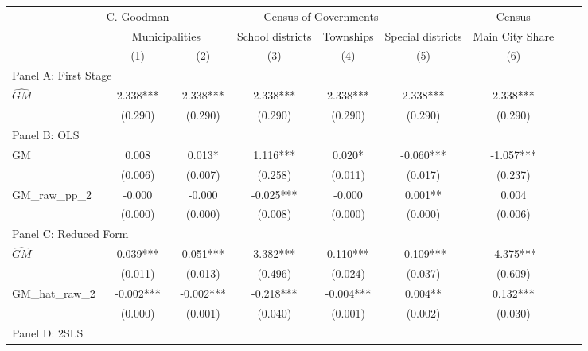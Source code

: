  \begin{tabular}{l*{8}{c}} \toprule
&\multicolumn{1}{c}{C. Goodman}&\multicolumn{4}{c}{Census of Governments}&\multicolumn{1}{c}{Census}\\\cmidrule(lr){2-2}\cmidrule(lr){3-6}\cmidrule(lr){7-7}
&\multicolumn{2}{c}{Municipalities}&\multicolumn{1}{c}{School districts}&\multicolumn{1}{c}{Townships}&\multicolumn{1}{c}{Special districts}&\multicolumn{1}{c}{Main City Share}\\\cmidrule(lr){2-3}\cmidrule(lr){4-6}\cmidrule(lr){7-7}
&\multicolumn{1}{c}{(1)}&\multicolumn{1}{c}{(2)}&\multicolumn{1}{c}{(3)}&\multicolumn{1}{c}{(4)}&\multicolumn{1}{c}{(5)}&\multicolumn{1}{c}{(6)}\\
\cmidrule(lr){1-7}
\multicolumn{6}{l}{Panel A: First Stage}\\
\cmidrule(lr){1-7}
$\widehat{GM}$  &    2.338***&    2.338***&    2.338***&    2.338***&    2.338***&    2.338***\\
                &  (0.290)   &  (0.290)   &  (0.290)   &  (0.290)   &  (0.290)   &  (0.290)   \\
\cmidrule(lr){1-7}
\multicolumn{6}{l}{Panel B: OLS}\\
\cmidrule(lr){1-7}
GM              &    0.008   &    0.013*  &    1.116***&    0.020*  &   -0.060***&   -1.057***\\
                &  (0.006)   &  (0.007)   &  (0.258)   &  (0.011)   &  (0.017)   &  (0.237)   \\
\addlinespace
GM\_raw\_pp\_2     &   -0.000   &   -0.000   &   -0.025***&   -0.000   &    0.001** &    0.004   \\
                &  (0.000)   &  (0.000)   &  (0.008)   &  (0.000)   &  (0.000)   &  (0.006)   \\
\cmidrule(lr){1-7}
\multicolumn{6}{l}{Panel C: Reduced Form}\\
\cmidrule(lr){1-7}
$\widehat{GM}$  &    0.039***&    0.051***&    3.382***&    0.110***&   -0.109***&   -4.375***\\
                &  (0.011)   &  (0.013)   &  (0.496)   &  (0.024)   &  (0.037)   &  (0.609)   \\
\addlinespace
GM\_hat\_raw\_2    &   -0.002***&   -0.002***&   -0.218***&   -0.004***&    0.004** &    0.132***\\
                &  (0.000)   &  (0.001)   &  (0.040)   &  (0.001)   &  (0.002)   &  (0.030)   \\
\cmidrule(lr){1-7}
\multicolumn{6}{l}{Panel D: 2SLS}\\
\cmidrule(lr){1-7}

\end{tabular}
